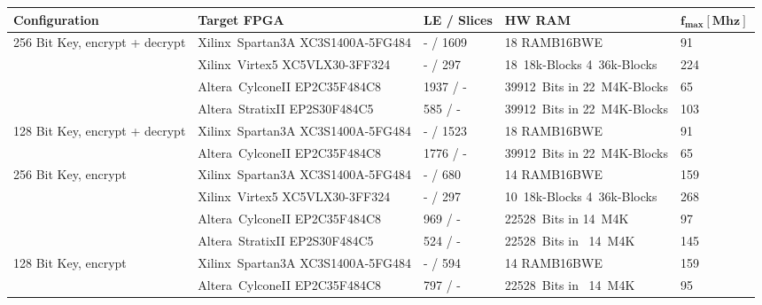 \documentclass{ruschidoc}
\begin{document}
\begin{tabularx}{\textwidth}{|p{30mm}|X|p{20mm}|p{30mm}|p{18mm}|}
  \hline
  \bf{Configuration} & \bf{Target FPGA}\footnotemark[1] & \bf{LE / Slices} & \bf{HW RAM} & $\mathbf{f_{max}[Mhz]}$  \\ \hline
	\multirow{4}{30mm}{256 Bit Key, encrypt + decrypt} & \mbox{Xilinx\rtm\ Spartan3A} XC3S1400A-5FG484 &  - / 1609 & 18 RAMB16BWE & 91 \\ \cline{2-5}
	& \mbox{Xilinx\rtm\ Virtex5}   XC5VLX30-3FF324 &  - / 297 & \mbox{18 18k-Blocks}  \mbox{4 36k-Blocks} & 224 \\ \cline{2-5}
	& \mbox{Altera\rtm\ CylconeII} EP2C35F484C8 & 1937 / - &  \mbox{39912 Bits} in  \mbox{22 M4K-Blocks} & 65 \\ \cline{2-5}
	& \mbox{Altera\rtm\ StratixII} EP2S30F484C5 & 585 / - &  \mbox{39912 Bits} in  \mbox{22 M4K-Blocks} & 103  \\  
	\hline
	\multirow{2}{30mm}{128 Bit Key, encrypt + decrypt} & \mbox{Xilinx\rtm\ Spartan3A} XC3S1400A-5FG484 &  - / 1523 & 18 RAMB16BWE & 91 \\ \cline{2-5}
		& \mbox{Altera\rtm\ CylconeII} EP2C35F484C8 & 1776 / - &  \mbox{39912 Bits} in  \mbox{22 M4K-Blocks} & 65 \\ 
	\hline
	\multirow{4}{30mm}{256 Bit Key, encrypt} & \mbox{Xilinx\rtm\ Spartan3A}  XC3S1400A-5FG484 &  - / 680 & 14 RAMB16BWE & 159 \\ \cline{2-5}
	& \mbox{Xilinx\rtm\ Virtex5}   XC5VLX30-3FF324 &  - / 297 & \mbox{10 18k-Blocks}  \mbox{4 36k-Blocks} & 268 \\ \cline{2-5}
	& \mbox{Altera\rtm\ CylconeII} EP2C35F484C8 & 969 / - &  \mbox{22528 Bits} in  \mbox{14 M4K} & 97 \\ \cline{2-5}
	& \mbox{Altera\rtm\ StratixII} EP2S30F484C5 & 524 / - &  \mbox{22528 Bits} in \mbox{ 14 M4K} & 145  \\ 
	\hline
	\multirow{2}{30mm}{128 Bit Key, encrypt} & \mbox{Xilinx\rtm\ Spartan3A}  XC3S1400A-5FG484 &  - / 594 & 14 RAMB16BWE & 159 \\ \cline{2-5}
	& \mbox{Altera\rtm\ CylconeII} EP2C35F484C8 & 797 / - & \mbox{22528 Bits} in  \mbox{ 14 M4K} & 95  \\ \cline{2-5} 
	\hline

\end{tabularx}
\label{tab:ressources}
\end{document}
